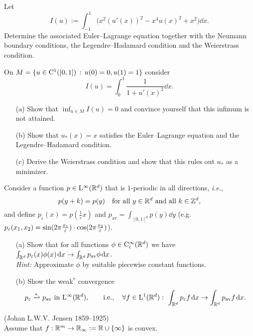 \documentclass[12pt,a4paper]{article}
\begin{document}

\setcounter{AUFGABE}{10}


Let 
\[
I(u):=\int_{-1}^1 \big (x^2(u'(x))^2-x^4u(x)^2+x^2 \big)
\dd x.
\]
Determine the associated Euler--Lagrange equation
together with
the Neumann boundary conditions,
the Legendre--Hadamard condition
and the Weierstrass condition.

On $M=\{u\in {\mathrm C}^1([0,1])\,:\,u(0)=0, u(1)=1\}$ consider
\[
I(u) = \int_0^1\frac{1}{1+u'(x)^2}\dd x.
\]
\begin{itemize}
\item [(a)] Show that $\inf_{u\in M} I(u) = 0$ 
and convince yourself that this infimum is not attained.

\item[(b)] Show that $u_*(x) = x$ satisfies the Euler--Lagrange equation and the Legendre--Hadamard
condition.

\item[(c)] Derive the Weierstrass condition and show that this rules out $u_*$ as a minimizer.
\end{itemize}

Consider a function $p\in {\mathrm L}^\infty({\mathbb R}^d)$
that is $1$-periodic in all directions,
\textit{i.e.},
\[
p(y+k)=p(y) \quad \text{for all }y\in{\mathbb R}^d \text{ and all }k\in{\mathbb Z}^d,
\]
and define $p_\varepsilon(x)=p(\frac{1}{\varepsilon}x)$
and $p_{\mathrm{av}}=\int_{[0,1]^d}p(y)\dd y$ (e.g. $p_\varepsilon(x_1,x_2)=\sin(2\pi \tfrac{ x_1}{\varepsilon})\cdot\cos(2\pi \tfrac{ x_2}{\varepsilon})$).
\begin{enumerate}
    \item[(a)]
    Show that for all functions $\phi\in{\mathrm C}_{{\mathrm c}}^\infty({\mathbb R}^d)$
    we have $\int_{{\mathbb R}^d}p_\varepsilon(x)\phi(x)\;\!\mathrm{d} x\to \int_{{\mathbb R}^d}p_{\mathrm{av}}\phi\;\!\mathrm{d} x$.
    \\
    \textit{Hint:} Approximate $\phi$ by suitable piecewise constant functions.
    \item[(b)]
    Show the weak$^\ast$ convergence 
    \[
    p_\varepsilon\xrightharpoonup{\ast} p_\text{av} \text{ in } \rmL^\infty(\R^d),
    \qquad
    \text{i.e.},
    \quad \forall f\in\rmL^1(\R^d): \ 
    \int_{\R^d}p_\varepsilon f\dd x \to \int_{\R^d}p_{\mathrm{av}}f\dd x.
    \]
\end{enumerate}

 {\footnotesize  (Johan L.W.V. Jensen
1859--1925)}\\
Assume that $f:{\mathbb R}^m\to {\mathbb R}_\infty:={\mathbb R}\cup\{\infty\}$ is convex. 
\end{document}
